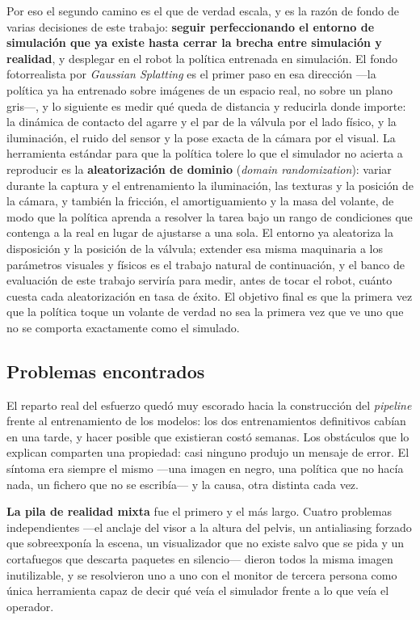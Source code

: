 \begin{enumerate}
	Por eso el segundo camino es el que de verdad escala, y es la razón de fondo de varias
	decisiones de este trabajo: \textbf{seguir perfeccionando el entorno de simulación que ya existe
	hasta cerrar la brecha entre simulación y realidad}, y desplegar en el robot la política
	entrenada en simulación. El fondo fotorrealista por \textit{Gaussian Splatting} es el primer
	paso en esa dirección —la política ya ha entrenado sobre imágenes de un espacio real, no sobre
	un plano gris—, y lo siguiente es medir qué queda de distancia y reducirla donde importe: la
	dinámica de contacto del agarre y el par de la válvula por el lado físico, y la iluminación,
	el ruido del sensor y la pose exacta de la cámara por el visual. La herramienta estándar para
	que la política tolere lo que el simulador no acierta a reproducir es la \textbf{aleatorización
	de dominio} (\textit{domain randomization}): variar durante la captura y el entrenamiento la
	iluminación, las texturas y la posición de la cámara, y también la fricción, el amortiguamiento
	y la masa del volante, de modo que la política aprenda a resolver la tarea bajo un rango de
	condiciones que contenga a la real en lugar de ajustarse a una sola. El entorno ya aleatoriza
	la disposición y la posición de la válvula; extender esa misma maquinaria a los parámetros
	visuales y físicos es el trabajo natural de continuación, y el banco de evaluación de este
	trabajo serviría para medir, antes de tocar el robot, cuánto cuesta cada aleatorización en
	tasa de éxito. El objetivo final es que la primera vez que la política toque un volante de
	verdad no sea la primera vez que ve uno que no se comporta exactamente como el simulado.

\end{enumerate}


\subsection*{Problemas encontrados}

El reparto real del esfuerzo quedó muy escorado hacia la construcción del \textit{pipeline} frente al
entrenamiento de los modelos: los dos entrenamientos definitivos cabían en una tarde, y hacer
posible que existieran costó semanas. Los obstáculos que lo explican comparten una propiedad: casi
ninguno produjo un mensaje de error. El síntoma era siempre el mismo —una imagen en negro, una
política que no hacía nada, un fichero que no se escribía— y la causa, otra distinta cada vez.

\textbf{La pila de realidad mixta} fue el primero y el más largo. Cuatro problemas independientes
—el anclaje del visor a la altura del pelvis, un antialiasing forzado que sobreexponía la escena,
un visualizador que no existe salvo que se pida y un cortafuegos que descarta paquetes en
silencio— dieron todos la misma imagen inutilizable, y se resolvieron uno a uno con el monitor de
tercera persona como única herramienta capaz de decir qué veía el simulador frente a lo que veía
el operador.

